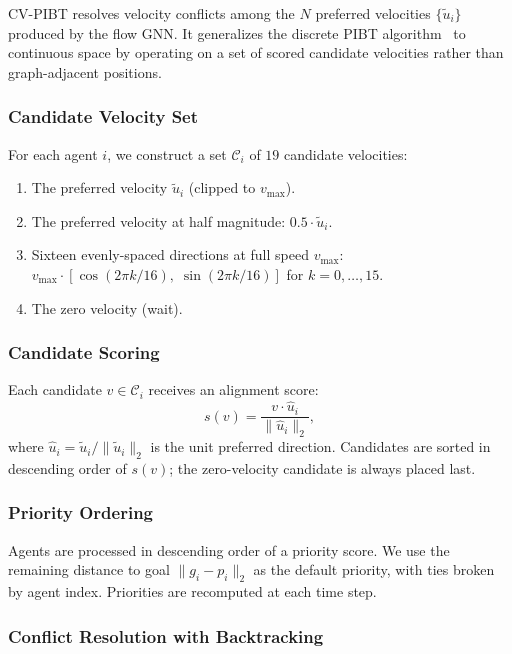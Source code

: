 CV-PIBT resolves velocity conflicts among the $N$ preferred velocities $\{\tilde{u}_i\}$ produced by the flow GNN. It generalizes the discrete PIBT algorithm~\cite{okumura2022pibt} to continuous space by operating on a set of scored candidate velocities rather than graph-adjacent positions.

\subsubsection{Candidate Velocity Set}

For each agent $i$, we construct a set $\mathcal{C}_i$ of $19$ candidate velocities:
\begin{enumerate}
  \item The preferred velocity $\tilde{u}_i$ (clipped to $v_{\max}$).
  \item The preferred velocity at half magnitude: $0.5 \cdot \tilde{u}_i$.
  \item Sixteen evenly-spaced directions at full speed $v_{\max}$: $v_{\max} \cdot [\cos(2\pi k/16),\; \sin(2\pi k/16)]$ for $k = 0, \ldots, 15$.
  \item The zero velocity (wait).
\end{enumerate}

\subsubsection{Candidate Scoring}

Each candidate $v \in \mathcal{C}_i$ receives an alignment score:
\[
  s(v) = \frac{v \cdot \hat{u}_i}{\|\hat{u}_i\|_2},
\]
where $\hat{u}_i = \tilde{u}_i / \|\tilde{u}_i\|_2$ is the unit preferred direction. Candidates are sorted in descending order of $s(v)$; the zero-velocity candidate is always placed last.

\subsubsection{Priority Ordering}

Agents are processed in descending order of a priority score. We use the remaining distance to goal $\|g_i - p_i\|_2$ as the default priority, with ties broken by agent index. Priorities are recomputed at each time step.

\subsubsection{Conflict Resolution with Backtracking}


